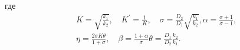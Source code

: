 где
\begin{equation}
	\begin{aligned}
		&K=\sqrt{\frac{k_1}{k_2}}, \quad K^{\prime}=\frac{1}{K}, \quad \sigma=\frac{D_2}{D_1} \sqrt{\frac{k_1}{k_2}}, \alpha=\frac{\sigma+1}{\sigma-1},\\
		&\eta=\frac{2 \sigma K \theta}{1+\sigma}, \quad \beta=\frac{1+\alpha}{\sigma} \theta=\frac{D_1}{D_2} \frac{k_2}{k_1}.
	\end{aligned}
\end{equation}
